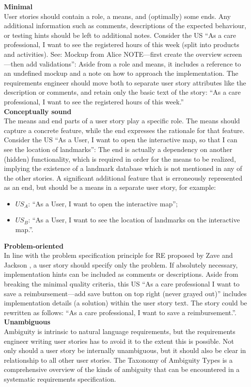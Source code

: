 \textbf{Minimal}\\ 
User stories should contain a role, a means, and (optimally) some ends. Any additional information such as comments, descriptions of the expected behaviour, or testing hints should be left to additional notes. Consider the US \enquote{As a care professional, I want to see the registered hours of this week (split into products and activities). See: Mockup from Alice NOTE—first create the overview screen—then add validations}: Aside from a role and means, it includes a reference to an undefined mockup and a note on how to approach the implementation. The requirements engineer should move both to separate user story attributes like the description or comments, and retain only the basic text of the story: \enquote{As a care professional, I want to see the registered hours of this week.} \\ 
\textbf{Conceptually sound}\\ 
The means and end parts of a user story play a specific role. The means should capture a concrete feature, while the end expresses the rationale for that feature. Consider the US \enquote{As a User, I want to open the interactive map, so that I can see the location of landmarks}: The end is actually a dependency on another (hidden) functionality, which is required in order for the means to be realized, implying the existence of a landmark database which is not mentioned in any of the other stories. A significant additional feature that is erroneously represented as an end, but should be a means in a separate user story, for example:
\begin{itemize}
\item $US_A$: \enquote{As a User, I want to open the interactive map};
\item $US_B$: \enquote{As a User, I want to see the location of landmarks on the interactive map.}.
\end{itemize}
\textbf{Problem-oriented}\\ 
In line with the problem specification principle for RE proposed by Zave and Jackson \cite{zave1997four}, a user story should specify only the problem. If absolutely necessary, implementation hints can be included as comments or descriptions. Aside from breaking the minimal quality criteria, this US \enquote{As a care professional I want to save a reimbursement—add save button on top right (never grayed out)} includes implementation details (a solution) within the user story text. The story could be rewritten as follows: \enquote{As a care professional, I want to save a reimbursement.}. \\ 
\textbf{Unambiguous}\\ 
Ambiguity is intrinsic to natural language requirements, but the requirements engineer writing user stories has to avoid it to the extent this is possible. Not only should a user story be internally unambiguous, but it should also be clear in relationship to all other user stories. The Taxonomy of Ambiguity Types \cite{berry2004ambiguity} is a comprehensive overview of the kinds of ambiguity that can be encountered in a systematic requirements specification.


